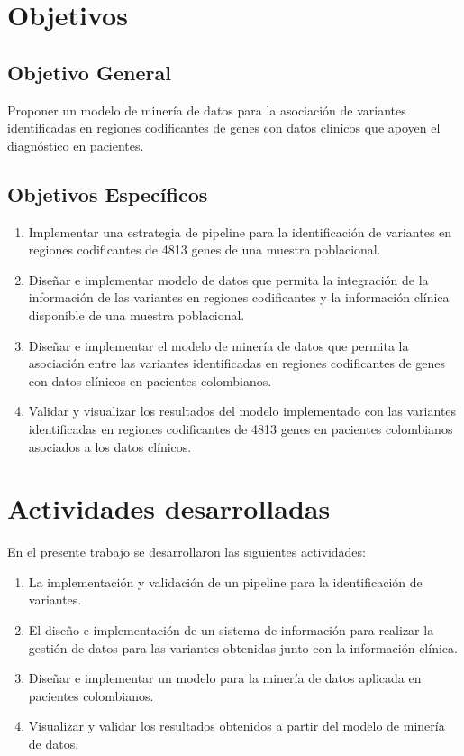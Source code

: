 \section*{Objetivos}

\subsection*{Objetivo General}%
 
Proponer un modelo de minería de datos para la asociación de variantes  identificadas en regiones codificantes de genes con datos clínicos que apoyen el
diagnóstico en pacientes.

\subsection*{Objetivos Espec\'ificos}

\begin{enumerate}
	\item Implementar una estrategia de pipeline para la identificación de variantes en regiones codificantes de 4813 genes de una muestra poblacional.
	\item Diseñar e implementar modelo de datos que permita la integración de la información de las variantes en regiones codificantes y la información  clínica disponible de una muestra poblacional.
	\item Diseñar e implementar el modelo de minería de datos que permita la	asociación entre las variantes identificadas en regiones codificantes de genes con datos clínicos en pacientes colombianos.
	\item Validar y visualizar los resultados del modelo implementado con las variantes identificadas en regiones codificantes de 4813 genes en	pacientes colombianos asociados a los datos clínicos.  
\end{enumerate}

\section*{Actividades desarrolladas}

En el presente trabajo se desarrollaron las siguientes actividades:

\begin{enumerate}  
	\item La implementación y validación de un pipeline para la identificación de variantes.
	\item El diseño e implementación de un sistema de información para realizar la gestión de datos para las variantes obtenidas junto con la información clínica.
	\item Diseñar e implementar un modelo para la  minería de datos aplicada en pacientes colombianos.
	\item Visualizar y validar los resultados  obtenidos a partir del modelo de minería de datos.
\end{enumerate}

